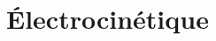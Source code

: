 \documentclass[a4paper, 10pt, garamond]{book}
\begin{document}
\part{Électrocinétique}
% 
% 
% 
% 
% 
% 
% 
% 
% 
% 
% 
% 
% 
% 
% 
% 
% 
% 
% 
% 
% 
% 
% 
% 
% 
% 
% 
% 
% 
% 
% 
% 
% 
% 
% 
% 
% 
% 
\end{document}
